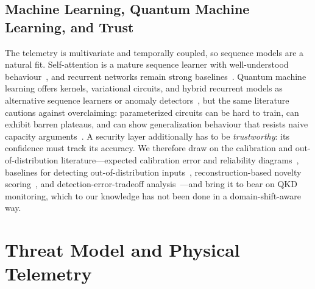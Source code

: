 \documentclass[runningheads]{llncs}
\begin{document}
\subsection{Machine Learning, Quantum Machine Learning, and Trust}
The telemetry is multivariate and temporally coupled, so sequence models are a natural fit. Self-attention is a mature sequence learner with well-understood behaviour~\cite{vaswani2017attention}, and recurrent networks remain strong baselines~\cite{hochreiter1997lstm}. Quantum machine learning offers kernels, variational circuits, and hybrid recurrent models as alternative sequence learners or anomaly detectors~\cite{rebentrost2014quantum,schuld2019quantum,havlicek2019supervised,qlstm,chen,data_reuploading,corli2024review}, but the same literature cautions against overclaiming: parameterized circuits can be hard to train, can exhibit barren plateaus, and can show generalization behaviour that resists naive capacity arguments~\cite{mcclean2018barren,cerezo2021variational,larocca2024review,gilfuster2024generalization,haug2024qfim,lu2020quantum,lu}. A security layer additionally has to be \emph{trustworthy}: its confidence must track its accuracy. We therefore draw on the calibration and out-of-distribution literature---expected calibration error and reliability diagrams~\cite{guo2017calibration,naeini2015ece}, baselines for detecting out-of-distribution inputs~\cite{hendrycks2017baseline}, reconstruction-based novelty scoring~\cite{an2015variational}, and detection-error-tradeoff analysis~\cite{martin1997det}---and bring it to bear on QKD monitoring, which to our knowledge has not been done in a domain-shift-aware way.

\section{Threat Model and Physical Telemetry}\label{sec:threat}
\end{document}
